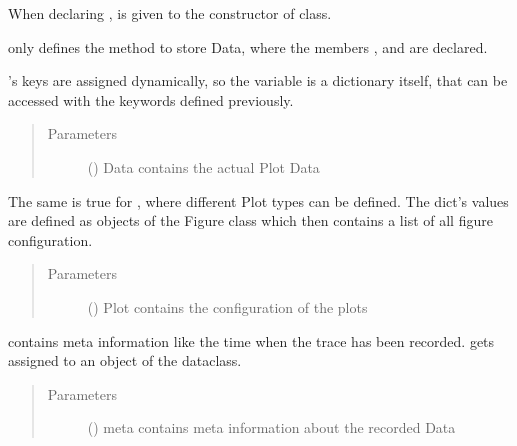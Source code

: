 \documentclass[letterpaper,10pt,english]{sphinxmanual}
\begin{document}
\begin{fulllineitems}
When declaring ,  is given to the constructor of  class.

\begin{fulllineitems}
\label{\detokenize{DataAnalyzer.Data:DataAnalyzer.Data.cl_data.FileData.PlotData}}
 only defines the  method to store Data, where the members , 
and  are declared.

’s keys are assigned dynamically, so the variable  is a dictionary itself, that
can be accessed with the keywords defined previously.
\begin{quote}\begin{description}
\item[{Parameters}] \leavevmode
{} () \textendash{} Data contains the actual Plot Data

\end{description}\end{quote}

The same is true for , where different Plot types can be defined. The dict’s values are defined
as objects of the Figure class which then contains a list of all figure configuration.
\begin{quote}\begin{description}
\item[{Parameters}] \leavevmode
{} () \textendash{} Plot contains the configuration of the plots

\end{description}\end{quote}

 contains meta information like the time when the trace has been recorded.  gets
assigned to an object of the  dataclass.
\begin{quote}\begin{description}
\item[{Parameters}] \leavevmode
{} () \textendash{} meta contains meta information about the recorded Data


\end{description}
\end{quote}
\end{fulllineitems}
\end{fulllineitems}
\end{document}
